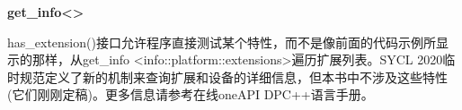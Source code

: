 \hspace*{\fill} \par %
\textbf{get\_info<>}

has\_extension()接口允许程序直接测试某个特性，而不是像前面的代码示例所显示的那样，从get\_info <info::platform::extensions>遍历扩展列表。SYCL 2020临时规范定义了新的机制来查询扩展和设备的详细信息，但本书中不涉及这些特性(它们刚刚定稿)。更多信息请参考在线oneAPI DPC++语言手册。
















